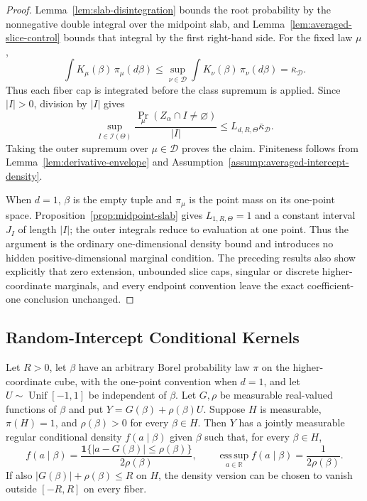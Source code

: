 \begin{proof}
Lemma~\ref{lem:slab-disintegration} bounds the root probability by the
nonnegative double integral over the midpoint slab, and
Lemma~\ref{lem:averaged-slice-control} bounds that integral by the first
right-hand side.  For the fixed law $\mu$,
\[
\int K_\mu(\beta)\,\pi_\mu(d\beta)
\leq\sup_{\nu\in\mathcal D}
\int K_\nu(\beta)\,\pi_\nu(d\beta)
=\bar\kappa_{\mathcal D}.
\]
Thus each fiber cap is integrated before the class supremum is applied.
Since $|I|>0$, division by $|I|$ gives
\[
\sup_{I\in\mathscr I(\Theta)}
\frac{\Pr_\mu(Z_\alpha\cap I\neq\varnothing)}{|I|}
\leq L_{d,R,\Theta}\bar\kappa_{\mathcal D}.
\]
Taking the outer supremum over $\mu\in\mathcal D$ proves the claim.
Finiteness follows from Lemma~\ref{lem:derivative-envelope} and
Assumption~\ref{assump:averaged-intercept-density}.

When $d=1$, $\beta$ is the empty tuple and $\pi_\mu$ is the point mass
on its one-point space.  Proposition~\ref{prop:midpoint-slab} gives
$L_{1,R,\Theta}=1$ and a constant interval $J_I$ of length $|I|$; the
outer integrals reduce to evaluation at one point.  Thus the argument is
the ordinary one-dimensional density bound and introduces no hidden
positive-dimensional marginal condition.  The preceding results also
show explicitly that zero extension, unbounded slice caps, singular or
discrete higher-coordinate marginals, and every endpoint convention
leave the exact coefficient-one conclusion unchanged.
\end{proof}
\subsection{Random-Intercept Conditional Kernels}
\label{app:random-intercepts}

\begin{lemma}
\label{lem:conditional-uniform-kernel}
Let $R>0$, let $\beta$ have an arbitrary Borel probability law $\pi$ on
the higher-coordinate cube, with the one-point convention when $d=1$,
and let $U\sim\operatorname{Unif}[-1,1]$ be independent of $\beta$.
Let $G,\rho$ be measurable real-valued functions of $\beta$ and put
$Y=G(\beta)+\rho(\beta)U$.  Suppose $H$ is measurable,
$\pi(H)=1$, and $\rho(\beta)>0$ for every $\beta\in H$.  Then $Y$ has a
jointly measurable regular conditional density $f(a\mid\beta)$ given
$\beta$ such that, for every $\beta\in H$,
\[
f(a\mid\beta)
=\frac{\mathbf1\{|a-G(\beta)|\leq\rho(\beta)\}}
       {2\rho(\beta)},
\qquad
\operatorname*{ess\,sup}_{a\in\mathbb R}f(a\mid\beta)
=\frac{1}{2\rho(\beta)}.
\]
If also $|G(\beta)|+\rho(\beta)\leq R$ on $H$, the density version can
be chosen to vanish outside $[-R,R]$ on every fiber.
\end{lemma}

